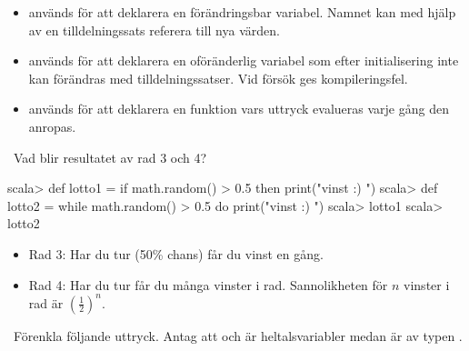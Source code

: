 \SubtaskSolved
\begin{itemize}
\item {} används för att deklarera en förändringsbar variabel. Namnet kan med hjälp av en tilldelningssats referera till nya värden.

\item {} används för att deklarera en oföränderlig variabel som efter initialisering inte kan förändras med tilldelningssatser. Vid försök ges kompileringsfel.
\item {} används för att deklarera en funktion vars uttryck evalueras varje gång den anropas.
\end{itemize}

\QUESTEND





\QUESTBEGIN

\Task \what~Vad blir resultatet av rad 3 och 4?

\begin{REPL}
scala> def lotto1 = if math.random() > 0.5 then print("vinst :) ")
scala> def lotto2 = while math.random() > 0.5 do print("vinst :) ")
scala> lotto1
scala> lotto2
\end{REPL}

\SOLUTION

\TaskSolved \what

\begin{itemize}
\item Rad 3: Har du tur (50\% chans) får du vinst en gång.

\item Rad 4: Har du tur får du många vinster i rad. Sannolikheten för $n$ vinster i rad är $(\frac{1}{2})^n$.
\end{itemize}
\QUESTEND












\clearpage

\AdvancedTasks   %






\QUESTBEGIN

\Task \what~Förenkla följande uttryck. Antag att  och  är heltalsvariabler medan  är av typen .

